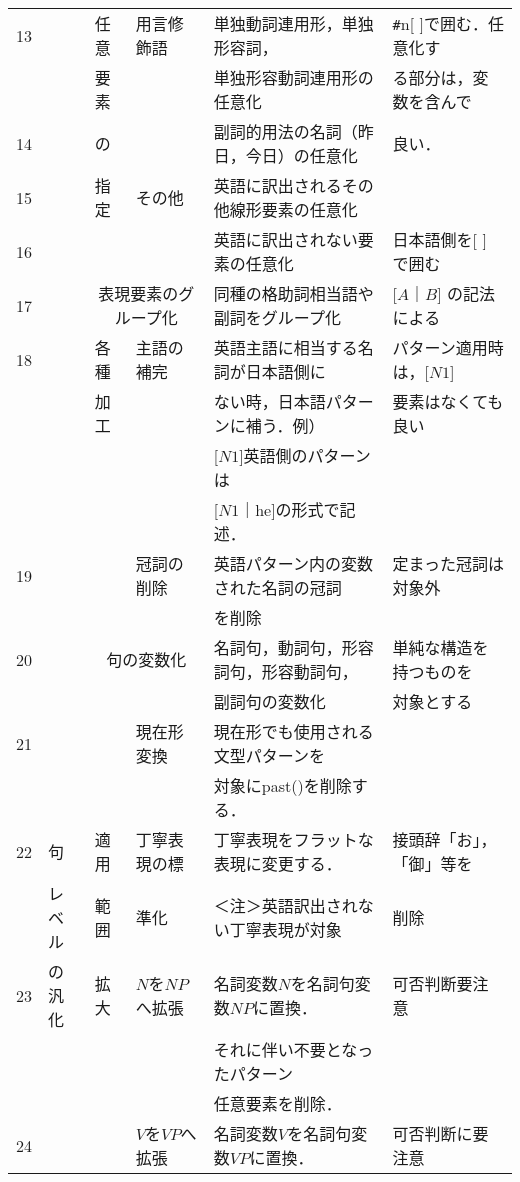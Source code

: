 \documentclass{nlp}
\begin{document}
\begin{table}[!htbp]
\begin{center}
\begin{tabular}{|c|l|p{7mm}|l|l|l|}
13 & & 任意 & 用言修飾語 & 単独動詞連用形，単独形容詞， & \verb|#|n[ ]で囲む．任意化す \\ 
 & & 要素 & & 単独形容動詞連用形の任意化 & る部分は，変数を含んで \\ \cline{1-1}\cline{5-5}
14 & & の & & 副詞的用法の名詞（昨日，今日）の任意化 & 良い． \\ \cline{1-1}\cline{4-5}
15 & & 指定 & その他 & 英語に訳出されるその他線形要素の任意化 & \\ \cline{1-1}\cline{5-6}
16 & & & & 英語に訳出されない要素の任意化 & 日本語側を[ ] で囲む \\ \cline{1-1}\cline{3-6}
17 & & \multicolumn{2}{|c|}{表現要素のグループ化} & 同種の格助詞相当語や副詞をグループ化 & [$A$｜$B$] の記法による \\ \cline{1-1}\cline{3-6}
18 & & 各種 & 主語の補完 & 英語主語に相当する名詞が日本語側に& パターン適用時は，[$N1$] \\
 & & 加工 & & ない時，日本語パターンに補う．例） & 要素はなくても良い \\
 & & & & [$N1$]英語側のパターンは & \\ 
 & & & & [$N1$｜he]の形式で記述． & \\ \cline{1-1}\cline{4-6}
19 & & & 冠詞の削除 & 英語パターン内の変数された名詞の冠詞 & 定まった冠詞は対象外 \\ 
 & & & & を削除 &  \\ \hline
20 & & \multicolumn{2}{|c|}{句の変数化} & 名詞句，動詞句，形容詞句，形容動詞句， & 単純な構造を持つものを \\
 & & \multicolumn{2}{|c|}{ } & 副詞句の変数化 & 対象とする \\ \cline{1-1}\cline{3-6} 
21 & & & 現在形変換 & 現在形でも使用される文型パターンを &  \\
 & & & & 対象にpast()を削除する．&  \\ \cline{1-1}\cline{4-6}
22 & 句 & 適用 & 丁寧表現の標 & 丁寧表現をフラットな表現に変更する．& 接頭辞「お」，「御」等を \\
 & レベル & 範囲 & 準化 & ＜注＞英語訳出されない丁寧表現が対象 & 削除 \\ \cline{1-1}\cline{4-6}
23 & の汎化 & 拡大 & $N$を$NP$へ拡張 & 名詞変数$N$を名詞句変数$NP$に置換． & 可否判断要注意 \\
 & & & & それに伴い不要となったパターン & \\ 
 & & & & 任意要素を削除．& \\ \cline{1-1}\cline{4-6}
24 & & & $V$を$VP$へ拡張 & 名詞変数$V$を名詞句変数$VP$に置換．& 可否判断に要注意  \\ \cline{1-1}\cline{4-6}

\end{tabular}
\end{center}
\end{table}
\end{document}
